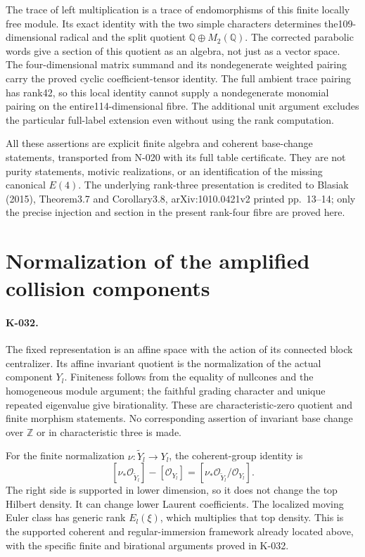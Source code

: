 The trace of left multiplication is a trace of endomorphisms of this
finite locally free module. Its exact identity with the two simple
characters determines the109-dimensional radical and the split quotient
$\mathbb Q\oplus M_2(\mathbb Q)$. The corrected parabolic words give
a section of this quotient as an algebra, not just as a vector space.
The four-dimensional matrix summand and its nondegenerate weighted
pairing carry the proved cyclic coefficient-tensor identity. The full
ambient trace pairing has rank42, so this local identity cannot supply
a nondegenerate monomial pairing on the entire114-dimensional fibre.
The additional unit argument excludes the particular full-label
extension even without using the rank computation.

All these assertions are explicit finite algebra and coherent
base-change statements, transported from N-020 with its full table
certificate. They are not purity statements, motivic realizations,
or an identification of the missing canonical $E(4)$. The underlying
rank-three presentation is credited to Blasiak (2015), Theorem3.7 and
Corollary3.8, arXiv:1010.0421v2 printed pp.~13--14; only the precise
injection and section in the present rank-four fibre are proved here.

\section{Normalization of the amplified collision components}
\paragraph{K-032.}
The fixed representation is an affine space with the action of its
connected block centralizer. Its affine invariant quotient is the
normalization of the actual component $Y_l$. Finiteness follows from
the equality of nullcones and the homogeneous module argument; the
faithful grading character and unique repeated eigenvalue give
birationality. These are characteristic-zero quotient and finite
morphism statements. No corresponding assertion of invariant base
change over $\mathbb Z$ or in characteristic three is made.

For the finite normalization $\nu:\widetilde Y_l\to Y_l$, the
coherent-group identity is
\[
 [\nu_*\mathcal O_{\widetilde Y_l}]-[\mathcal O_{Y_l}]
       =[\nu_*\mathcal O_{\widetilde Y_l}/\mathcal O_{Y_l}].
\]
The right side is supported in lower dimension, so it does not change
the top Hilbert density. It can change lower Laurent coefficients.
The localized moving Euler class has generic rank $E_l(\xi)$,
which multiplies that top density. This is the supported coherent
and regular-immersion framework already located above, with the
specific finite and birational arguments proved in K-032.

